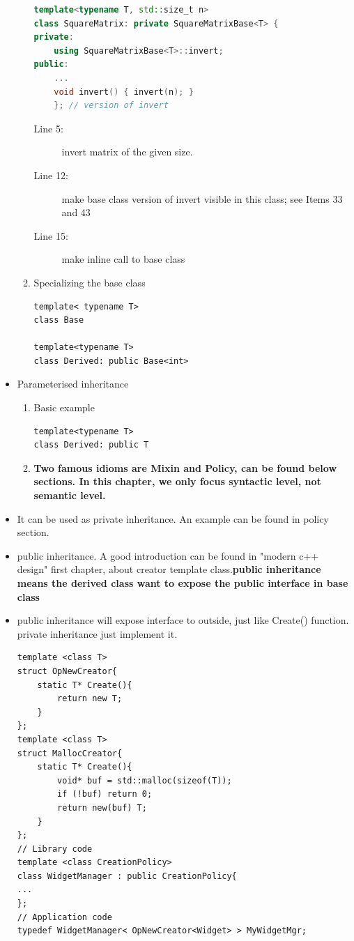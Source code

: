 \documentclass[a4paper,11pt,twoside]{book}
\begin{document}
\begin{itemize}
\begin{enumerate}
\begin{lstlisting}[frame=single, language=c++]
template<typename T, std::size_t n>
class SquareMatrix: private SquareMatrixBase<T> {
private:
	using SquareMatrixBase<T>::invert; 
public:
	...
	void invert() { invert(n); } 
	}; // version of invert
\end{lstlisting}
\begin{description}
	\item[Line 5:] invert matrix of the given size.
	\item[Line 12:] make base class version of invert visible in this class; see Items 33 and 43
	\item[Line 15:] make inline call to base class
\end{description}

	
	\item Specializing the base class
\begin{lstlisting}[numbers=none]
template< typename T>
class Base
	
template<typename T>
class Derived: public Base<int>
\end{lstlisting}
\end{enumerate}

\item Parameterised inheritance
	\begin{enumerate}
	\item Basic example 
\begin{lstlisting}[numbers=none]
template<typename T>
class Derived: public T
\end{lstlisting}
	
	\item \textbf{Two famous idioms are Mixin and Policy, can be found below sections. In this chapter, we only focus syntactic level, not semantic level.}

	\end{enumerate}

\item It can be used as private inheritance. An example can be found in policy section. 

\item public inheritance. A good introduction can be found in "modern c++ design" first chapter, about creator template class.\textbf{public inheritance means the derived class want to expose the public interface in base class}

\item public inheritance will expose interface to outside, just like Create() function. private inheritance just implement it. 

\begin{lstlisting}[numbers=none]
template <class T>
struct OpNewCreator{
	static T* Create(){
		return new T;
	}
};
template <class T>
struct MallocCreator{
	static T* Create(){
		void* buf = std::malloc(sizeof(T));
		if (!buf) return 0;
		return new(buf) T;
	}
}; 
// Library code
template <class CreationPolicy>
class WidgetManager : public CreationPolicy{
...
}; 
// Application code
typedef WidgetManager< OpNewCreator<Widget> > MyWidgetMgr; 
\end{lstlisting}


\end{itemize}
\end{document}
